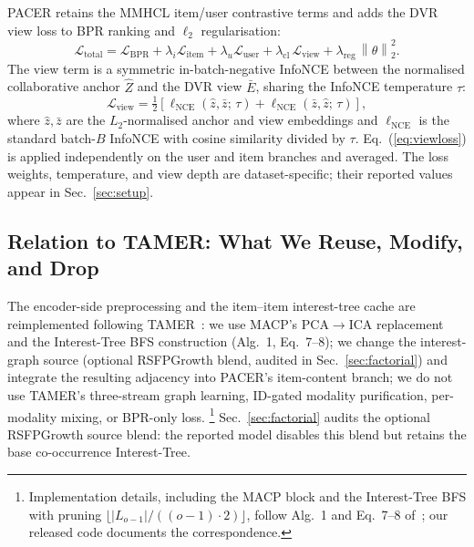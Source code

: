 \documentclass[conference]{IEEEtran}
\newcommand{\Lcal}{\mathcal{L}}
\newcommand{\norm}[1]{\left\lVert #1 \right\rVert}
\newcommand{\dvr}{DVR\xspace}
\begin{document}
PACER retains the MMHCL item/user contrastive terms and adds the \dvr
view loss to BPR ranking and $\ell_2$ regularisation:
\begin{equation}
\Lcal_{\text{total}} =
  \Lcal_{\text{BPR}}
  +\lambda_i\Lcal_{\text{item}}+\lambda_u\Lcal_{\text{user}}
  + \lambda_{\text{cl}}\,\Lcal_{\text{view}}
  + \lambda_{\text{reg}}\,\norm{\theta}_2^2.
\label{eq:totalloss}
\end{equation}
The view term is a symmetric in-batch-negative InfoNCE between the
normalised collaborative anchor $\hat Z$ and the \dvr view $\bar E$,
sharing the InfoNCE
temperature $\tau$:
\begin{equation}
\Lcal_{\text{view}} =
  \tfrac{1}{2}\!\left[
    \ell_{\text{NCE}}(\hat z, \bar z;\, \tau)
    + \ell_{\text{NCE}}(\bar z, \hat z;\, \tau)
  \right],
\label{eq:viewloss}
\end{equation}
where $\hat z, \bar z$ are the $L_2$-normalised anchor and view
embeddings and $\ell_{\text{NCE}}$ is the standard batch-$B$ InfoNCE
with cosine similarity divided by $\tau$. Eq.~(\ref{eq:viewloss}) is
applied independently on the user and item branches and averaged.
The loss weights, temperature, and view depth are dataset-specific;
their reported values appear in Sec.~\ref{sec:setup}.

\subsection{Relation to TAMER: What We Reuse, Modify, and Drop}
\label{sec:tamerrel}

The encoder-side preprocessing and the item--item interest-tree
cache are reimplemented following TAMER~\cite{meng2025tamer}: we use
MACP's PCA$\to$ICA replacement and the Interest-Tree BFS
construction (Alg.~1, Eq.~7--8); we change the interest-graph source
(optional RSFPGrowth blend, audited in Sec.~\ref{sec:factorial})
and integrate the resulting adjacency into PACER's item-content
branch; we do not use TAMER's
three-stream graph learning, ID-gated modality purification,
per-modality mixing, or BPR-only loss.
\footnote{Implementation details, including the MACP block and the
Interest-Tree BFS with pruning
$\lfloor|L_{o-1}|/((o{-}1)\cdot 2)\rfloor$, follow Alg.~1 and
Eq.~7--8 of~\cite{meng2025tamer}; our released code documents the
correspondence.}
Sec.~\ref{sec:factorial} audits the optional RSFPGrowth source blend:
the reported model disables this blend but retains the base
co-occurrence Interest-Tree.
\end{document}
